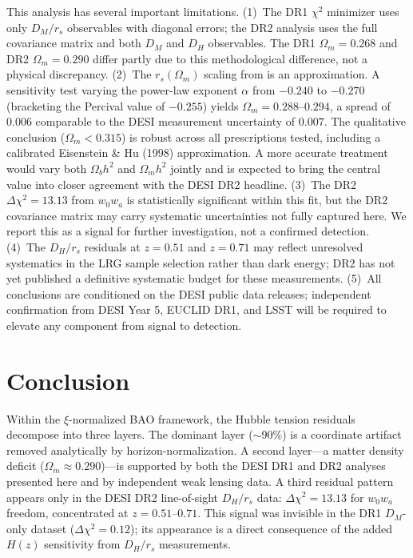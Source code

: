 \documentclass[12pt,a4paper]{article}
\begin{document}
This analysis has several important limitations.
(1)~The DR1 $\chi^2$ minimizer uses only $D_M/r_s$ observables with diagonal
errors; the DR2 analysis uses the full covariance matrix and both $D_M$ and
$D_H$ observables. The DR1 $\Omega_m = 0.268$ and DR2 $\Omega_m = 0.290$
differ partly due to this methodological difference, not a physical discrepancy.
(2)~The $r_s(\Omega_m)$ scaling from \citealt{Percival2007} is an
approximation. A sensitivity test varying the power-law exponent $\alpha$ from
$-0.240$ to $-0.270$ (bracketing the Percival value of $-0.255$) yields
$\Omega_m = 0.288$--$0.294$, a spread of $0.006$ comparable to the DESI
measurement uncertainty of $0.007$. The qualitative conclusion ($\Omega_m <
0.315$) is robust across all prescriptions tested, including a calibrated
Eisenstein \& Hu (1998) approximation. A more accurate treatment would vary
both $\Omega_b h^2$ and $\Omega_m h^2$ jointly and is expected to bring the
central value into closer agreement with the DESI DR2 headline.
(3)~The DR2 $\Delta\chi^2 = 13.13$ from $w_0w_a$ is statistically significant
within this fit, but the DR2 covariance matrix may carry systematic
uncertainties not fully captured here. We report this as a signal for further
investigation, not a confirmed detection.
(4)~The $D_H/r_s$ residuals at $z=0.51$ and $z=0.71$ may reflect unresolved
systematics in the LRG sample selection rather than dark energy; DR2 has not
yet published a definitive systematic budget for these measurements.
(5)~All conclusions are conditioned on the DESI public data releases;
independent confirmation from DESI Year 5, EUCLID DR1, and LSST will be
required to elevate any component from signal to detection.

\section{Conclusion}

Within the $\xi$-normalized BAO framework, the Hubble tension residuals
decompose into three layers. The dominant layer ($\sim$90\%) is a coordinate
artifact removed analytically by horizon-normalization. A second layer---a
matter density deficit ($\Omega_m \approx 0.290$)---is supported by both the
DESI DR1 and DR2 analyses presented here and by independent weak lensing data.
A third residual pattern appears only in the DESI DR2 line-of-sight $D_H/r_s$
data: $\Delta\chi^2 = 13.13$ for $w_0w_a$ freedom, concentrated at
$z = 0.51$--$0.71$. This signal was invisible in the DR1 $D_M$-only dataset
($\Delta\chi^2 = 0.12$); its appearance is a direct consequence of the added
$H(z)$ sensitivity from $D_H/r_s$ measurements.
\end{document}
